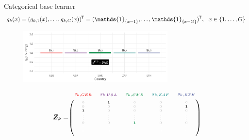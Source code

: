\documentclass[t,10pt]{beamer}
\begin{document}
\begin{frame}{Categorical base learner}
  \vspace{-0.3cm}\[g_k(x) = (g_{k,1}(x), \dots, g_{k,G}(x))^\tran = (\mathds{1}_{\{x = 1\}}, \dots, \mathds{1}_{\{x = G\}})^\tran, \ \ x\in\{1, \dots, G\}\]
  \begin{center}
    \begin{figure}
      \includegraphics[width=0.7\textwidth]{figures/bs-cat/fig-cat4.png}
    \end{figure}
    \vspace{-0.5cm}
    \[
      \design_k = \tiny\begin{blockarray}{ccccc}
        \color[HTML]{EE0000}g_{k,GER} & \color[HTML]{631879}g_{k,USA} & \color[HTML]{008B45}g_{k,SWE} & \color[HTML]{008280}g_{k,ZAF} & \color[HTML]{3B4992}g_{k,ETH}\\
      \begin{block}{(ccccc)}
        \phantom{x}\\
        \color{lightgray}0 & \color{black}\bm{1} & \color{lightgray}0 & \color{lightgray}0 & \color{lightgray}0 \\
        \color{lightgray}0 & \color{lightgray}0 & \color{lightgray}0 & \color{lightgray}0 & \color{black}\bm{1} \\
        \color{black}\bm{1} & \color{lightgray}0 & \color{lightgray}0 & \color{lightgray}0 & \color{lightgray}0 \\
        \color{lightgray}\vdots & \color{lightgray}\vdots & \color{lightgray}\vdots & \color{lightgray}\vdots & \color{lightgray}\vdots \\
        \color{lightgray}0 & \color{lightgray}0 & \color[HTML]{008B45}\bm{1} & \color{lightgray}0 & \color{lightgray}0 \\
        \color{white}0 & \color{white}0 & \color{white}0 & \color{white}0 & \color{white}0 \\
        \color{white}0 & \color{white}0 & \color{white}0 & \color{white}0 & \color{white}0 \color{black}\\
        \phantom{x}\\
      \end{block}
    \end{blockarray}
    \]
    \normalsize
  \end{center}
  \addtocounter{framenumber}{-1}
\end{frame}
\end{document}
